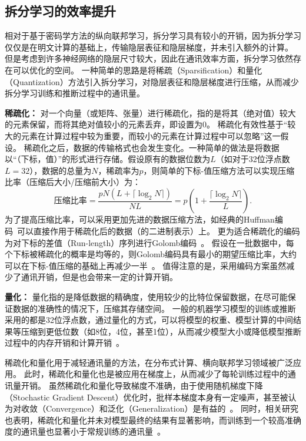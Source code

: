 \subsection{拆分学习的效率提升}
相对于基于密码学方法的纵向联邦学习，拆分学习具有较小的开销，因为拆分学习仅仅是在明文计算的基础上，传输隐层表征和隐层梯度，并未引入额外的计算。
%
但是考虑到许多神经网络的隐层尺寸较大，因此在通讯效率方面，拆分学习依然存在可以优化的空间。
%
一种简单的思路是将稀疏（Sparsification）和量化（Quantization）方法引入拆分学习，对隐层表征和隐层梯度进行压缩，从而减少拆分学习训练和推断过程中的通讯量。
%

\textbf{稀疏化：}
对一个向量（或矩阵、张量）进行稀疏化，指的是将其（绝对值）较大的元素保留，而将其绝对值较小的元素丢弃，即设置为0。
%
稀疏化有效性基于“较大的元素在计算过程中较为重要，而较小的元素在计算过程中可以忽略”这一假设。
%
稀疏化之后，数据的传输格式也会发生变化。一种简单的做法是将数据以“（下标，值）”的形式进行存储。假设原有的数据位数为$L$（如对于32位浮点数$L=32$），数据的总量为$N$，稀疏率为$p$，则简单的下标-值压缩方法可以实现压缩比率（压缩后大小/压缩前大小）为：
\begin{equation}
    \text{压缩比率}=\dfrac{pN(L + \lceil \log_2N \rceil)}{NL} = p(1 + \dfrac{\lceil \log_2N \rceil}{L}).
\end{equation}
为了提高压缩比率，可以采用更加先进的数据压缩方法，如经典的Huffman编码~\cite{huffman1952}可以直接作用于稀疏化后的数据（的二进制表示）上。
%
更为适合稀疏化的编码为对下标的差值（Run-length）序列进行Golomb编码~\cite{gallager1975golomb}。
%
假设在一批数据中，每个下标被稀疏化的概率是均等的，则Golomb编码具有最小的期望压缩比率，大约可以在下标-值压缩的基础上再减少一半~\cite{sattler2019sparse_binary}。
%
值得注意的是，采用编码方案虽然减少了通讯开销，但是也会带来一定的计算开销。


\textbf{量化：}
量化指的是降低数据的精确度，使用较少的比特位保留数据，在尽可能保证数据的准确性的情况下，压缩其存储空间。
%
一般的机器学习模型的训练或推断采用的都是32位浮点数，通过量化的方式，可以将模型的权重、模型计算的中间结果等压缩到更低位数（如8位，4位，甚至1位），从而减少模型大小或降低模型推断过程中的内存开销和计算开销~\cite{zhou2016dorefa,banner2018_8bit,yang2019quantization}。




稀疏化和量化用于减轻通讯量的方法，在分布式计算、横向联邦学习领域被广泛应用。
%
此时，稀疏化和量化也是被应用在梯度上，从而减少了每轮训练过程中的通讯量开销。
%
虽然稀疏化和量化导致梯度不准确，由于使用随机梯度下降（Stochastic Gradient Descent）优化时，批样本梯度本身有一定噪声，甚至被认为对收敛（Convergence）和泛化（Generalization）是有益的~\cite{hardt2016sgd,goyal2017sgd_imagenet,chaudhari2018sgd}。
%
同时，相关研究也表明，稀疏化和量化并未对模型最终的结果有显著影响，而训练到一个较高准确度的通讯量也显著小于常规训练的通讯量~\cite{aji2017sparse,sattler2019sparse_binary,wen2017terngrad}。

